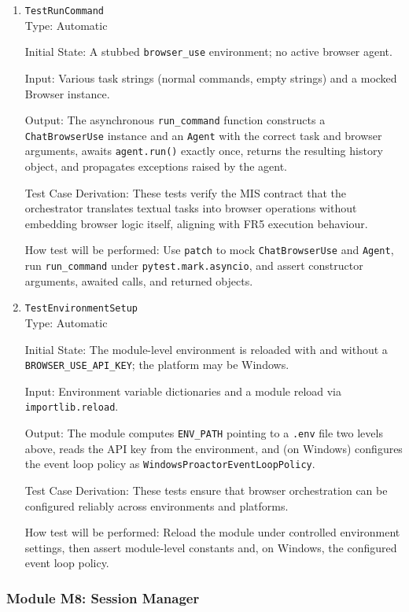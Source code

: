 \documentclass[12pt, titlepage]{article}
\begin{document}
\begin{enumerate}
\item{\texttt{TestRunCommand}\\}
Type: Automatic

Initial State: A stubbed \texttt{browser\_use} environment; no active browser agent.

Input: Various task strings (normal commands, empty strings) and a mocked Browser instance.

Output: The asynchronous \texttt{run\_command} function constructs a \texttt{ChatBrowserUse} instance and an \texttt{Agent} with the correct task and browser arguments, awaits \texttt{agent.run()} exactly once, returns the resulting history object, and propagates exceptions raised by the agent.

Test Case Derivation: These tests verify the MIS contract that the orchestrator translates textual tasks into browser operations without embedding browser logic itself, aligning with FR5 execution behaviour.

How test will be performed: Use \texttt{patch} to mock \texttt{ChatBrowserUse} and \texttt{Agent}, run \texttt{run\_command} under \texttt{pytest.mark.asyncio}, and assert constructor arguments, awaited calls, and returned objects.

\item{\texttt{TestEnvironmentSetup}\\}
Type: Automatic

Initial State: The module-level environment is reloaded with and without a \texttt{BROWSER\_USE\_API\_KEY}; the platform may be Windows.

Input: Environment variable dictionaries and a module reload via \texttt{importlib.reload}.

Output: The module computes \texttt{ENV\_PATH} pointing to a \texttt{.env} file two levels above, reads the API key from the environment, and (on Windows) configures the event loop policy as \texttt{WindowsProactorEventLoopPolicy}.

Test Case Derivation: These tests ensure that browser orchestration can be configured reliably across environments and platforms.

How test will be performed: Reload the module under controlled environment settings, then assert module-level constants and, on Windows, the configured event loop policy.
\end{enumerate}

\subsubsection{Module M8: Session Manager}
\end{document}
